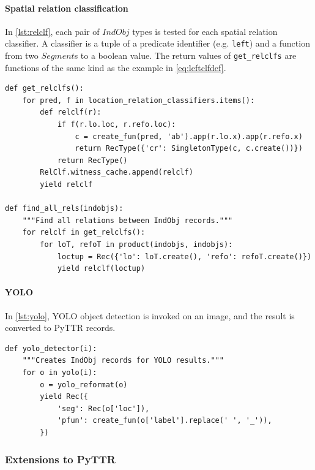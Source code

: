\paragraph{Spatial relation classification}

In \autoref{lst:relclf}, each pair of $IndObj$ types is tested for each spatial relation classifier.
A classifier is a tuple of a predicate identifier (e.g. {\tt left}) and a function from two $Segment$s to a boolean value.
The return values of {\tt get\_relclfs} are functions of the same kind as the example in \autoref{eq:leftclfdef}.

\begin{lstlisting}[label=lst:relclf, caption=Spatial relation classifiers]
def get_relclfs():
    for pred, f in location_relation_classifiers.items():
        def relclf(r):
            if f(r.lo.loc, r.refo.loc):
                c = create_fun(pred, 'ab').app(r.lo.x).app(r.refo.x)
                return RecType({'cr': SingletonType(c, c.create())})
            return RecType()
        RelClf.witness_cache.append(relclf)
        yield relclf

def find_all_rels(indobjs):
    """Find all relations between IndObj records."""
    for relclf in get_relclfs():
        for loT, refoT in product(indobjs, indobjs):
            loctup = Rec({'lo': loT.create(), 'refo': refoT.create()})
            yield relclf(loctup)
\end{lstlisting}

\paragraph{YOLO}

In \autoref{lst:yolo}, YOLO object detection is invoked on an image, and the result is converted to PyTTR records.

\begin{lstlisting}[label=lst:yolo, caption=YOLO usage]
def yolo_detector(i):
    """Creates IndObj records for YOLO results."""
    for o in yolo(i):
        o = yolo_reformat(o)
        yield Rec({
            'seg': Rec(o['loc']),
            'pfun': create_fun(o['label'].replace(' ', '_')),
        })
\end{lstlisting}



\subsubsection{Extensions to PyTTR}


